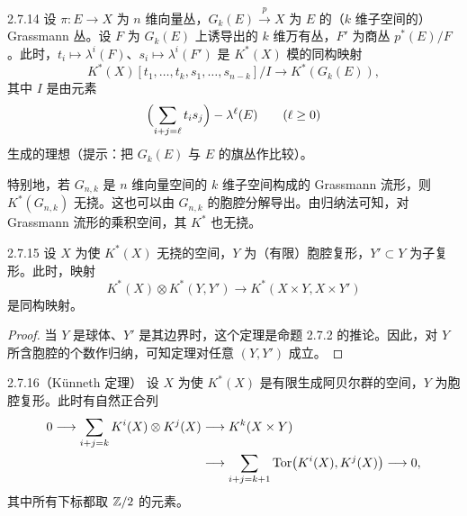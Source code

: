 \begin{proposition*}{2.7.14}
  设 $\pi\colon E\to X$ 为 $n$ 维向量丛，$G_k(E)\xrightarrow{\ p\ }X$ 为 $E$ 的（$k$ 维子空间的）Grassmann 丛。设 $F$ 为 $G_k(E)$ 上诱导出的 $k$ 维万有丛，$F'$ 为商丛 $p^*(E)/F$。此时，$t_i\mapsto\lambda^i(F)$、$s_i\mapsto\lambda^i(F')$ 是 $K^*(X)$ 模的同构映射
  \[
  K^*(X)[t_1,\ldots,t_k,s_1,\ldots,s_{n-k}]/I\longrightarrow K^*(G_k(E)),
  \]
  其中 $I$ 是由元素
  \[
  \Bigl(\sum_{i+j=\ell}t_is_j\Bigr)-\lambda^\ell(E)\qquad(\ell\ge0)
  \]
  生成的理想（提示：把 $G_k(E)$ 与 $E$ 的旗丛作比较）。
\end{proposition*}

特别地，若 $G_{n,k}$ 是 $n$ 维向量空间的 $k$ 维子空间构成的 Grassmann 流形，则 $K^*(G_{n,k})$ 无挠。这也可以由 $G_{n,k}$ 的胞腔分解导出。由归纳法可知，对 Grassmann 流形的乘积空间，其 $K^*$ 也无挠。

\begin{theorem*}{2.7.15}
  设 $X$ 为使 $K^*(X)$ 无挠的空间，$Y$ 为（有限）胞腔复形，$Y'\subset Y$ 为子复形。此时，映射
  \[
  K^*(X)\otimes K^*(Y,Y')\longrightarrow K^*(X\times Y,X\times Y')
  \]
  是同构映射。
\end{theorem*}

\begin{proof}
  当 $Y$ 是球体、$Y'$ 是其边界时，这个定理是命题 2.7.2 的推论。因此，对 $Y$ 所含胞腔的个数作归纳，可知定理对任意 $(Y,Y')$ 成立。
\end{proof}

\begin{corollary*}{2.7.16}（Künneth 定理）
  设 $X$ 为使 $K^*(X)$ 是有限生成阿贝尔群的空间，$Y$ 为胞腔复形。此时有自然正合列
  \[
  \begin{aligned}
  0\longrightarrow\sum_{i+j=k}K^i(X)\otimes K^j(X)&\longrightarrow K^k(X\times Y)\\
  &\longrightarrow\sum_{i+j=k+1}\operatorname{Tor}\bigl(K^i(X),K^j(X)\bigr)\longrightarrow0,
  \end{aligned}
  \]
  其中所有下标都取 $\mathbb{Z}/2$ 的元素。
\end{corollary*}


